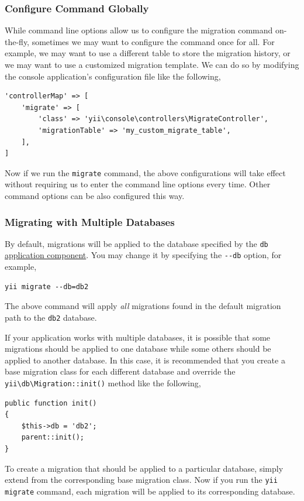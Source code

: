 \subsubsection{Configure Command Globally}
While command line options allow us to configure the migration command
on-the-fly, sometimes we may want to configure the command once for all.
For example, we may want to use a different table to store the migration history,
or we may want to use a customized migration template. We can do so by modifying
the console application's configuration file like the following,

\lstset{language=php}\begin{lstlisting}
'controllerMap' => [
    'migrate' => [
        'class' => 'yii\console\controllers\MigrateController',
        'migrationTable' => 'my_custom_migrate_table',
    ],
]
\end{lstlisting}
Now if we run the \lstinline|migrate| command, the above configurations will take effect
without requiring us to enter the command line options every time. Other command options
can be also configured this way.

\subsubsection{Migrating with Multiple Databases}
By default, migrations will be applied to the database specified by the \lstinline|db| \hyperref[structure-application-components.md]{application component}.
You may change it by specifying the \lstinline|--db| option, for example,

\begin{lstlisting}
yii migrate --db=db2
\end{lstlisting}
The above command will apply \textit{all} migrations found in the default migration path to the \lstinline|db2| database.

If your application works with multiple databases, it is possible that some migrations should be applied
to one database while some others should be applied to another database. In this case, it is recommended that
you create a base migration class for each different database and override the \texttt{yii{\allowbreak{}\textbackslash}db{\allowbreak{}\textbackslash}Migration\allowbreak{}::\allowbreak{}init()}
method like the following,

\lstset{language=php}\begin{lstlisting}
public function init()
{
    $this->db = 'db2';
    parent::init();
}
\end{lstlisting}
To create a migration that should be applied to a particular database, simply extend from the corresponding
base migration class. Now if you run the \lstinline|yii migrate| command, each migration will be applied to its corresponding database.

